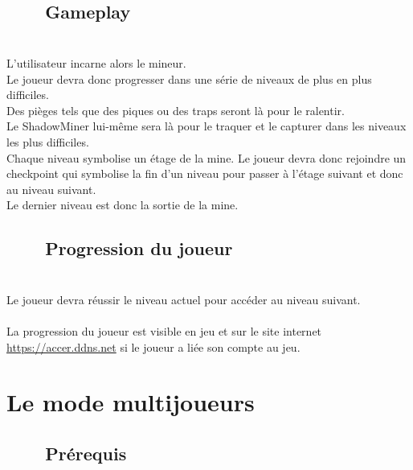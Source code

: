 \documentclass[titlepage, 13px, a4paper]{report}
\begin{document}
\subsection[Gameplay]{~~~~Gameplay}
\paragraph{} \hspace{0pt} \\
L’utilisateur incarne alors le mineur. \\
Le joueur devra donc progresser dans une série de niveaux de plus en plus difficiles. \\
Des pièges tels que des piques ou des traps seront là pour le ralentir. \\
Le ShadowMiner lui-même sera là pour le traquer et le capturer dans les niveaux les plus difficiles. \\
Chaque niveau symbolise un étage de la mine. Le joueur devra donc rejoindre un checkpoint 
qui symbolise la fin d’un niveau pour passer à l’étage suivant et donc au niveau suivant. \\
Le dernier niveau est donc la sortie de la mine. \\ 

\subsection[Progression du joueur]{~~~~Progression du joueur}
\paragraph{} \hspace{0pt} \\
Le joueur devra réussir le niveau actuel pour accéder au niveau suivant. \\ \\
La progression du joueur est visible en jeu et sur le site internet \url{https://accer.ddns.net} si le joueur a liée son compte au jeu. \\

\newpage

\section{Le mode multijoueurs}

\subsection[Prérequis]{~~~~Prérequis}
\end{document}
